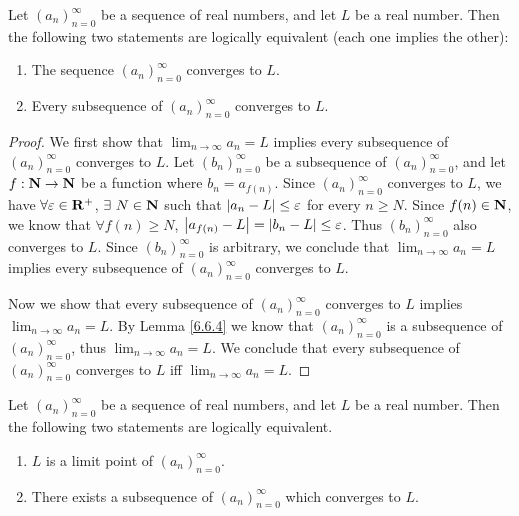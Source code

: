 \begin{proposition}\label{6.6.5}
    Let \((a_n)_{n = 0}^\infty\) be a sequence of real numbers, and let \(L\) be a real number.
    Then the following two statements are logically equivalent (each one implies the other):
    \begin{enumerate}
        \item The sequence \((a_n)_{n = 0}^\infty\) converges to \(L\).
        \item Every subsequence of \((a_n)_{n = 0}^\infty\) converges to \(L\).
    \end{enumerate}
\end{proposition}

\begin{proof}
    We first show that \(\lim_{n \to \infty} a_n = L\) implies every subsequence of \((a_n)_{n = 0}^\infty\) converges to \(L\).
    Let \((b_n)_{n = 0}^\infty\) be a subsequence of \((a_n)_{n = 0}^\infty\), and let \(f : \mathbf{N} \to \mathbf{N}\) be a function where \(b_n = a_{f(n)}\).
    Since \((a_n)_{n = 0}^\infty\) converges to \(L\), we have \(\forall \varepsilon \in \mathbf{R}^+\), \(\exists\ N \in \mathbf{N}\) such that \(\left\lvert a_n - L\right\rvert \leq \varepsilon\) for every \(n \geq N\).
    Since \(f(n) \in \mathbf{N}\), we know that \(\forall f(n) \geq N\), \(\left\lvert a_{f(n)} - L\right\rvert = \left\lvert b_n - L\right\rvert \leq \varepsilon\).
    Thus \((b_n)_{n = 0}^\infty\) also converges to \(L\).
    Since \((b_n)_{n = 0}^\infty\) is arbitrary, we conclude that \(\lim_{n \to \infty} a_n = L\) implies every subsequence of \((a_n)_{n = 0}^\infty\) converges to \(L\).

    Now we show that every subsequence of \((a_n)_{n = 0}^\infty\) converges to \(L\) implies \(\lim_{n \to \infty} a_n = L\).
    By Lemma \ref{6.6.4} we know that \((a_n)_{n = 0}^\infty\) is a subsequence of \((a_n)_{n = 0}^\infty\), thus \(\lim_{n \to \infty} a_n = L\).
    We conclude that every subsequence of \((a_n)_{n = 0}^\infty\) converges to \(L\) iff \(\lim_{n \to \infty} a_n = L\).
\end{proof}

\begin{proposition}\label{6.6.6}
    Let \((a_n)_{n = 0}^\infty\) be a sequence of real numbers, and let \(L\) be a real number.
    Then the following two statements are logically equivalent.
    \begin{enumerate}
        \item \(L\) is a limit point of \((a_n)_{n = 0}^\infty\).
        \item There exists a subsequence of \((a_n)_{n = 0}^\infty\) which converges to \(L\).
    \end{enumerate}
\end{proposition}

